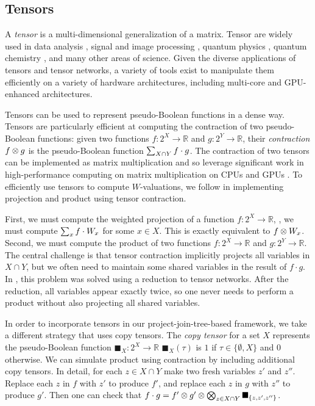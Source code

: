 \subsection{Tensors}

A \emph{tensor} is a multi-dimensional generalization of a matrix.
Tensor are widely used in data analysis \cite{Cichocki14}, signal and image processing \cite{cichocki2015tensor}, quantum physics \cite{arad2010quantum}, quantum chemistry \cite{smilde2005multi}, and many other areas of science.
Given the diverse applications of tensors and tensor networks, a variety of tools \cite{baumgartner2005synthesis,KKCLA17} exist to manipulate them efficiently on a variety of hardware architectures, including multi-core and GPU-enhanced architectures.

Tensors can be used to represent pseudo-Boolean functions in a dense way.
Tensors are particularly efficient at computing the contraction of two pseudo-Boolean functions: given two functions $f: 2^X \to \mathbb{R}$ and $g: 2^Y \to \mathbb{R}$, their \emph{contraction} $f \otimes g$ is the pseudo-Boolean function $\sum_{X \cap Y} f \cdot g$.
The contraction of two tensors can be implemented as matrix multiplication and so leverage significant work in high-performance computing on matrix multiplication on CPUs \cite{LHKK77} and GPUs \cite{FSH04}.
To efficiently use tensors to compute $W$-valuations, we follow \cite{DDV19} in implementing projection and product using tensor contraction.

First, we must compute the weighted projection of a function $f: 2^X \to \mathbb{R}$, \ie, we must compute $\sum_x f \cdot W_x$ for some $x \in X$.
This is exactly equivalent to $f \otimes W_x$.
Second, we must compute the product of two functions $f: 2^X \to \mathbb{R}$ and $g: 2^Y \to \mathbb{R}$.
The central challenge is that tensor contraction implicitly projects all variables in $X \cap Y$, but we often need to maintain some shared variables in the result of $f \cdot g$.
In \cite{DDV19}, this problem was solved using a reduction to tensor networks.
After the reduction, all variables appear exactly twice, so one never needs to perform a product without also projecting all shared variables.

In order to incorporate tensors in our project-join-tree-based framework, we take a different strategy that uses copy tensors.
The \emph{copy tensor} for a set $X$ represents the pseudo-Boolean function $\blacksquare_X: 2^X \to \mathbb{R}$ \st{} $\blacksquare_X(\tau)$ is $1$ if $\tau \in \{ \emptyset, X \}$ and $0$ otherwise.
We can simulate product using contraction by including additional copy tensors.
In detail, for each $z \in X \cap Y$ make two fresh variables $z'$ and $z''$.
Replace each $z$ in $f$ with $z'$ to produce $f'$, and replace each $z$ in $g$ with $z''$ to produce $g'$.
Then one can check that $f \cdot g = f' \otimes g' \otimes \bigotimes_{z \in X \cap Y} \blacksquare_{\{z, z', z''\}}$.

